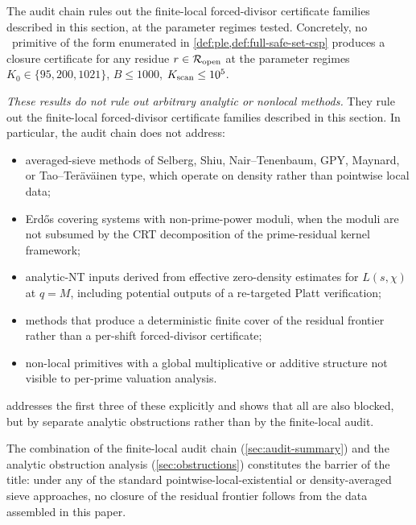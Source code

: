 \begin{remark}
\label{rem:audit-scope}
The audit chain rules out the finite-local forced-divisor certificate
families described in this section, at the parameter regimes tested.
Concretely, no \PLEclass\ primitive of the form enumerated in
\cref{def:ple,def:full-safe-set-csp} produces a closure certificate
for any residue $r \in \mathcal{R}_{\mathrm{open}}$ at the parameter regimes
$K_0 \in \{95, 200, 1021\}$, $B \le 1000$, $K_{\rm scan} \le 10^5$.

\emph{These results do not rule out arbitrary analytic or nonlocal
methods.} They rule out the finite-local forced-divisor certificate
families described in this section. In particular, the audit chain
does not address:
\begin{itemize}[leftmargin=*]
\item averaged-sieve methods of Selberg, Shiu, Nair--Tenenbaum,
  GPY, Maynard, or Tao--Ter\"av\"ainen type, which operate on
  density rather than pointwise local data;
\item Erd\H{o}s covering systems with non-prime-power moduli, when
  the moduli are not subsumed by the CRT decomposition of the
  prime-residual kernel framework;
\item analytic-NT inputs derived from effective zero-density
  estimates for $L(s, \chi)$ at $q = M$, including potential outputs
  of a re-targeted Platt verification;
\item methods that produce a deterministic finite cover of the
  residual frontier rather than a per-shift forced-divisor
  certificate;
\item non-local primitives with a global multiplicative or additive
  structure not visible to per-prime valuation analysis.
\end{itemize}

 addresses the first three of these
explicitly and shows that all are also blocked, but by separate
analytic obstructions rather than by the finite-local audit.
\end{remark}

The combination of the finite-local audit chain
(\cref{sec:audit-summary}) and the analytic obstruction analysis
(\cref{sec:obstructions}) constitutes the barrier of the title:
under any of the standard pointwise-local-existential or
density-averaged sieve approaches, no closure of the residual
frontier follows from the data assembled in this paper.


